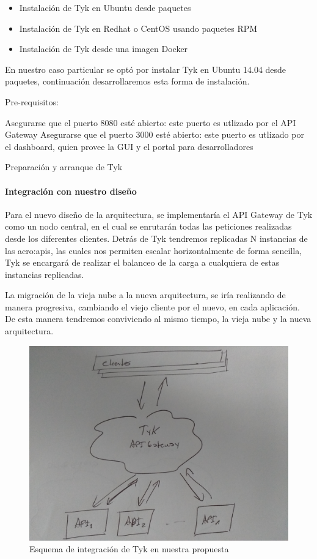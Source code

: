 \begin{itemize}
  \item Instalación de Tyk en Ubuntu desde paquetes
  \item Instalación de Tyk en Redhat o CentOS usando paquetes RPM
  \item Instalación de Tyk desde una imagen Docker
\end{itemize}

En nuestro caso particular se optó por instalar Tyk en Ubuntu 14.04 desde paquetes, continuación desarrollaremos esta forma de instalación.

Pre-requisitos:

Asegurarse que el puerto 8080 esté abierto: este puerto es utlizado por el API Gateway
Asegurarse que el puerto 3000 esté abierto: este puerto es utlizado por el dashboard, quien provee la GUI y el portal para desarrolladores

\begin{listing}[H]
  \caption{Preparación y arranque de Tyk}
  \label{soa:tecnologias:tyk:bash-preparacion}
\end{listing}


\paragraph{Integración con nuestro diseño}

Para el nuevo diseño de la arquitectura, se implementaría el API Gateway de Tyk como un nodo central, en el cual se enrutarán todas las peticiones realizadas desde los diferentes clientes.  Detrás de Tyk tendremos replicadas N instancias de las \glspl{acro:api}, las cuales nos permiten escalar horizontalmente de forma sencilla, Tyk se encargará de realizar el balanceo de la carga a cualquiera de estas instancias replicadas.

La migración de la vieja nube a la nueva arquitectura, se iría realizando de manera progresiva, cambiando el viejo cliente por el nuevo, en cada aplicación.  De esta manera tendremos conviviendo al mismo tiempo, la vieja nube y la nueva arquitectura.

\begin{figure}[H]
  \includegraphics[width=\linewidth]{src/images/03-capitulo-3/tecnologias/tyk/tyk-arq.jpg}
  \caption{Esquema de integración de Tyk en nuestra propuesta}
  \label{fig:integracion-tyk-arquitectura}
\end{figure}
